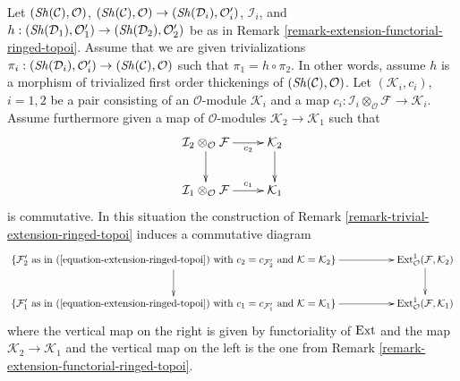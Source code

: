\begin{remark}
\label{remark-trivial-extension-functorial-ringed-topoi}
Let $(\mathop{\mathit{Sh}}\nolimits(\mathcal{C}), \mathcal{O})$,
$(\mathop{\mathit{Sh}}\nolimits(\mathcal{C}), \mathcal{O}) \to (\mathop{\mathit{Sh}}\nolimits(\mathcal{D}_i), \mathcal{O}'_i)$,
$\mathcal{I}_i$, and $h : (\mathop{\mathit{Sh}}\nolimits(\mathcal{D}_1), \mathcal{O}'_1) \to
(\mathop{\mathit{Sh}}\nolimits(\mathcal{D}_2), \mathcal{O}'_2)$ be as in
Remark \ref{remark-extension-functorial-ringed-topoi}.
Assume that we are given trivializations
$\pi_i : (\mathop{\mathit{Sh}}\nolimits(\mathcal{D}_i), \mathcal{O}'_i) \to
(\mathop{\mathit{Sh}}\nolimits(\mathcal{C}), \mathcal{O})$ such that
$\pi_1 = h \circ \pi_2$. In other words, assume $h$ is a morphism
of trivialized first order thickenings of $(\mathop{\mathit{Sh}}\nolimits(\mathcal{C}), \mathcal{O})$.
Let $(\mathcal{K}_i, c_i)$, $i = 1, 2$ be a pair consisting of an
$\mathcal{O}$-module $\mathcal{K}_i$ and a map
$c_i : \mathcal{I}_i \otimes_\mathcal{O} \mathcal{F} \to
\mathcal{K}_i$. Assume furthermore given a map
of $\mathcal{O}$-modules $\mathcal{K}_2 \to \mathcal{K}_1$
such that
$$
\xymatrix{
\mathcal{I}_2 \otimes_\mathcal{O} \mathcal{F}
\ar[r]_-{c_2} \ar[d] &
\mathcal{K}_2 \ar[d] \\
\mathcal{I}_1 \otimes_\mathcal{O} \mathcal{F}
\ar[r]^-{c_1} &
\mathcal{K}_1
}
$$
is commutative. In this situation the construction of
Remark \ref{remark-trivial-extension-ringed-topoi} induces
a commutative diagram
$$
\xymatrix{
\{\mathcal{F}'_2\text{ as in (\ref{equation-extension-ringed-topoi}) with }
c_2 = c_{\mathcal{F}'_2}\text{ and }\mathcal{K} = \mathcal{K}_2\}
\ar[d] \ar[rr] & &
\Ext^1_\mathcal{O}(\mathcal{F}, \mathcal{K}_2) \ar[d] \\
\{\mathcal{F}'_1\text{ as in (\ref{equation-extension-ringed-topoi}) with }
c_1 = c_{\mathcal{F}'_1}\text{ and }\mathcal{K} = \mathcal{K}_1\}
\ar[rr] & &
\Ext^1_\mathcal{O}(\mathcal{F}, \mathcal{K}_1)
}
$$
where the vertical map on the right is given by functoriality of $\mathop{\mathrm{Ext}}\nolimits$
and the map $\mathcal{K}_2 \to \mathcal{K}_1$ and the vertical map on the left
is the one from Remark \ref{remark-extension-functorial-ringed-topoi}.
\end{remark}

